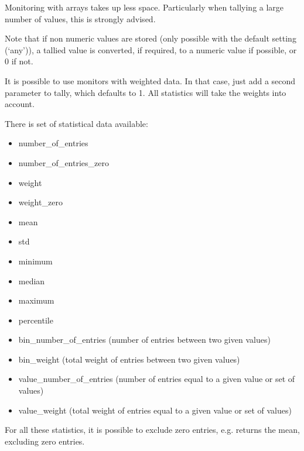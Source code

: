 \documentclass[letterpaper,10pt,english]{sphinxmanual}
\begin{document}
Monitoring with arrays takes up less space. Particularly when tallying a large
number of values, this is strongly advised.

Note that if non numeric values are stored (only possible with the default setting (‘any’)),
a tallied value is converted, if required, to a numeric value if possible, or 0 if not.

It is possible to use monitors with weighted data. In that case, just add a second parameter to tally, which defaults to 1.
All statistics will take the weights into account.

There is set of statistical data available:
\begin{itemize}
\item {} 
number\_of\_entries

\item {} 
number\_of\_entries\_zero

\item {} 
weight

\item {} 
weight\_zero

\item {} 
mean

\item {} 
std

\item {} 
minimum

\item {} 
median

\item {} 
maximum

\item {} 
percentile

\item {} 
bin\_number\_of\_entries (number of entries between two given values)

\item {} 
bin\_weight (total weight of entries between two given values)

\item {} 
value\_number\_of\_entries (number of entries equal to a given value or set of values)

\item {} 
value\_weight (total weight of entries equal to a given value or set of values)

\end{itemize}

For all these statistics, it is possible to exclude zero entries,
e.g.  returns the mean, excluding zero entries.
\end{document}

